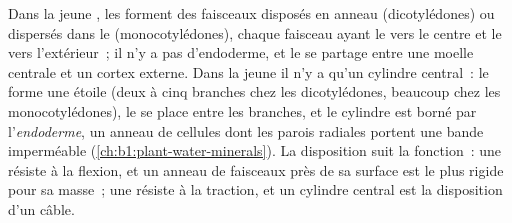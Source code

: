 \begin{proposition}\label{prop:b1:flowering-plant-organization:stemroot}
Dans la jeune , les  forment des faisceaux
disposés en anneau (dicotylédones) ou dispersés dans le  (monocotylédones), chaque faisceau ayant le  vers le
centre et le  vers l'extérieur~; il n'y a pas d'endoderme, et le
 se partage entre une moelle centrale et un cortex
externe. Dans la jeune  il n'y a qu'un cylindre central~: le
 forme une étoile (deux à cinq branches chez les dicotylédones,
beaucoup chez les monocotylédones), le  se place entre les
branches, et le cylindre est borné par l'\emph{endoderme},
un anneau de cellules dont les parois radiales portent une bande
imperméable (\cref{ch:b1:plant-water-minerals}). La disposition suit la
fonction~: une  résiste à la flexion, et un anneau de faisceaux
près de sa surface est le plus rigide pour sa masse~; une  résiste
à la traction, et un cylindre central est la disposition d'un câble.
\end{proposition}

